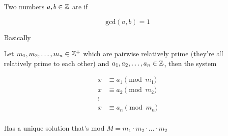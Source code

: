 \documentclass[../../Main.tex]{subfiles}
\begin{document}
\begin{definition}
    Two numbers $a, b \in \mathbb{Z}$ are  if 

    $$\text{gcd}(a, b) = 1$$
\end{definition}

\begin{theorem}
    Basically

    Let $m_1, m_2, \ldots, m_n \in \mathbb{Z}^+$ which are pairwise relatively prime (they're all relatively prime to each other)
    and $a_1, a_2, \ldots, a_n \in \mathbb{Z}$, then the system

    \begin{align*}
        x &\equiv a_1 \pmod{m_1} \\
        x &\equiv a_2 \pmod{m_2} \\
        \vdots \\
        x &\equiv a_n \pmod{m_n} \\
    \end{align*}

    Has a unique solution that's mod $M = m_1 \cdot m_2 \cdot \ldots \cdot m_2$
\end{theorem}
\end{document}
